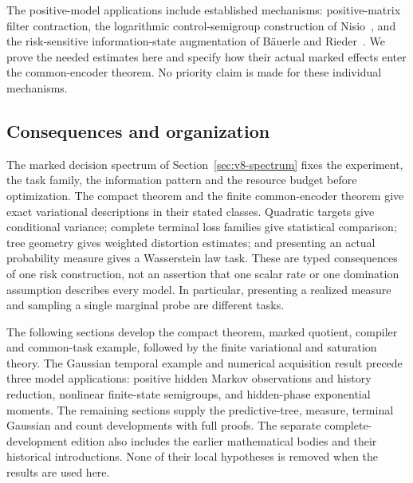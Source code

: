 The positive-model applications include established mechanisms:
positive-matrix filter contraction, the logarithmic control-semigroup
construction of Nisio~\cite{Nisio1976}, and the risk-sensitive
information-state augmentation of B\"auerle and
Rieder~\cite{BauerleRieder2017}. We prove the needed estimates here
and specify how their actual marked effects enter the common-encoder
theorem. No priority claim is made for these individual mechanisms.

\subsection{Consequences and organization}
The marked decision spectrum of Section~\ref{sec:v8-spectrum} fixes
the experiment, the task family, the information pattern and the
resource budget before optimization. The compact theorem and the
finite common-encoder theorem give exact variational descriptions
in their stated classes. Quadratic targets give conditional variance;
complete terminal loss families give statistical comparison; tree
geometry gives weighted distortion estimates; and presenting an
actual probability measure gives a Wasserstein law task. These are
typed consequences of one risk construction, not an assertion that
one scalar rate or one domination assumption describes every model.
In particular, presenting a realized measure and sampling a single
marginal probe are different tasks.

The following sections develop the compact theorem, marked quotient,
compiler and common-task example, followed by the finite variational
and saturation theory. The Gaussian temporal example and numerical
acquisition result precede three model applications: positive hidden
Markov observations and history reduction, nonlinear finite-state
semigroups, and hidden-phase exponential moments. The remaining
sections supply the predictive-tree, measure, terminal Gaussian and
count developments with full proofs. The separate complete-development
edition also includes the earlier mathematical bodies and their
historical introductions. None of their local hypotheses is removed
when the results are used here.
